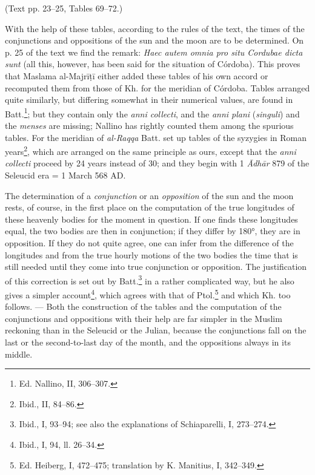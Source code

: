 \documentclass[11pt]{article}
\begin{document}
\par\begin{center}(Text pp. 23–25, Tables 69–72.)\end{center}
\par With the help of these tables, according to the rules of the text, the times of the conjunctions and oppositions of the sun and the moon are to be determined. On p. 25 of the text we find the remark: \emph{Haec autem omnia pro situ Cordubae dicta sunt} (all this, however, has been said for the situation of Córdoba). This proves that Maslama al-Majrīṭī either added these tables of his own accord or recomputed them from those of Kh. for the meridian of Córdoba. Tables arranged quite similarly, but differing somewhat in their numerical values, are found in Batt.\footnote{Ed. Nallino, II, 306–307.}; but they contain only the \emph{anni collecti}, and the \emph{anni plani} (\emph{singuli}) and the \emph{menses} are missing; Nallino has rightly counted them among the spurious tables. For the meridian of \emph{al-Raqqa} Batt. set up tables of the syzygies in Roman years\footnote{Ibid., II, 84–86.}, which are arranged on the same principle as ours, except that the \emph{anni collecti} proceed by 24 years instead of 30; and they begin with 1 \emph{Ādhār} 879 of the Seleucid era = 1 March 568 AD.\par
\par The determination of a \emph{conjunction} or an \emph{opposition} of the sun and the moon rests, of course, in the first place on the computation of the true longitudes of these heavenly bodies for the moment in question. If one finds these longitudes equal, the two bodies are then in conjunction; if they differ by 180°, they are in opposition. If they do not quite agree, one can infer from the difference of the longitudes and from the true hourly motions of the two bodies the time that is still needed until they come into true conjunction or opposition. The justification of this correction is set out by Batt.\footnote{Ibid., I, 93–94; see also the explanations of Schiaparelli, I, 273–274.} in a rather complicated way, but he also gives a simpler account\footnote{Ibid., I, 94, ll. 26–34.}, which agrees with that of Ptol.\footnote{Ed. Heiberg, I, 472–475; translation by K. Manitius, I, 342–349.} and which Kh. too follows. — Both the construction of the tables and the computation of the conjunctions and oppositions with their help are far simpler in the Muslim reckoning than in the Seleucid or the Julian, because the conjunctions fall on the last or the second-to-last day of the month, and the oppositions always in its middle.\par
\end{document}
